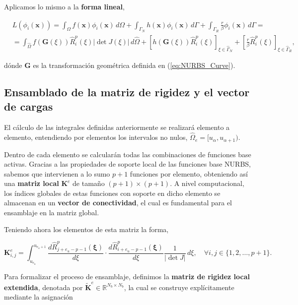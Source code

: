 \documentclass[11pt]{book}
\theoremstyle{plain} %
\theoremstyle{definition} %
\theoremstyle{definition} %
\begin{document}
Aplicamos lo mismo a la \textbf{forma lineal},

\begin{align*}
    &L(\phi_i(\mathbf{x})) = \int_{\Omega}f(\mathbf{x})\phi_i(\mathbf{x}) \, d\Omega + \int_{\Gamma_N}h(\mathbf{x})\phi_i(\mathbf{x}) \, d\Gamma + \int_{\Gamma_R}\frac{r}{\beta}\phi_i(\mathbf{x}) \, d\Gamma =\\[10pt]
    &= \int_{\hat{\Omega}}f(\mathbf{G}(\xi))\hat{R}_i^p(\xi)|\det J(\xi)| \, d\hat{\Omega} + \left[ h(\mathbf{G}(\xi))\hat{R}_i^p(\xi) \right]_{\xi \in \hat{\Gamma}_N} + \left[ \frac{r}{\beta}\hat{R}_i^p(\xi) \right]_{\xi \in \hat{\Gamma}_R},
\end{align*}

\noindent
dónde $\mathbf{G}$ es la transformación geométrica definida en (\ref{eq:NURBS_Curve}).

\subsection{Ensamblado de la matriz de rigidez y el vector de cargas}

El cálculo de las integrales definidas anteriormente se realizará elemento a elemento, entendiendo por elementos los intervalos no nulos, $\hat{\Omega}_e=[u_\alpha, u_{\alpha+1})$.

Dentro de cada elemento se calcularán todas las combinaciones de funciones base activas. Gracias a las propiedades de soporte local de las funciones base NURBS, sabemos que intervienen a lo sumo $p+1$
funciones por elemento, obteniendo así una \textbf{matriz local} $\mathbf{K}^e$ de tamaño $(p+1) \times (p+1)$. A nivel computacional,
los índices globales de estas funciones con soporte en dicho elemento se almacenan en un \textbf{vector de conectividad}, el cual es fundamental para el ensamblaje en la matriz global.

Teniendo ahora los elementos de esta matriz la forma,


\begin{equation*}
    \mathbf{K}_{i,j}^e=\int_{u_{e_u}}^{u_{e_u+1}} \frac{d\hat{R}_{j+ e_u - p - 1}^p(\boldsymbol{\xi})}{d\xi}\cdot \frac{d\hat{R}_{i+ e_u - p - 1}^p(\boldsymbol{\xi})}{d\xi} \frac{1}{|\det J|} \, d\xi,\quad \forall i,j \in \{1,2, \dots, p+1\}.
\end{equation*}

Para formalizar el proceso de ensamblaje, definimos la \textbf{matriz de rigidez local extendida}, denotada por $\widetilde{\mathbf{K}}^e \in \mathbb{R}^{N_b \times N_b}$, la cual se construye explícitamente mediante la asignación
\end{document}
